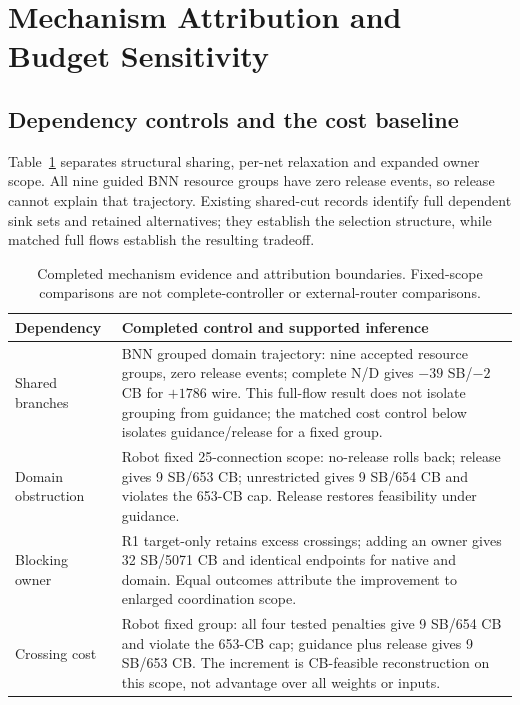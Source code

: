 \documentclass[conference,10pt]{IEEEtran}
\begin{document}
\section{Mechanism Attribution and Budget Sensitivity}
\subsection{Dependency controls and the cost baseline}
Table~\ref{tab:attribution} separates structural sharing, per-net relaxation and expanded owner scope. All nine guided BNN resource groups have zero release events, so release cannot explain that trajectory. Existing shared-cut records identify full dependent sink sets and retained alternatives; they establish the selection structure, while matched full flows establish the resulting tradeoff.

\begin{table}[t]
\centering\footnotesize\setlength{\tabcolsep}{3pt}
\caption{Completed mechanism evidence and attribution boundaries. Fixed-scope comparisons are not complete-controller or external-router comparisons.}
\label{tab:attribution}
\begin{tabular}{p{}p{}}\hline
Dependency & Completed control and supported inference\\\hline
Shared branches & BNN grouped domain trajectory: nine accepted resource groups, zero release events; complete N/D gives $-39$ SB/$-2$ CB for $+1786$ wire. This full-flow result does not isolate grouping from guidance; the matched cost control below isolates guidance/release for a fixed group.\\
Domain obstruction & Robot fixed 25-connection scope: no-release rolls back; release gives 9 SB/653 CB; unrestricted gives 9 SB/654 CB and violates the 653-CB cap. Release restores feasibility under guidance.\\
Blocking owner & R1 target-only retains excess crossings; adding an owner gives 32 SB/5071 CB and identical endpoints for native and domain. Equal outcomes attribute the improvement to enlarged coordination scope.\\
Crossing cost & Robot fixed group: all four tested penalties give 9 SB/654 CB and violate the 653-CB cap; guidance plus release gives 9 SB/653 CB. The increment is CB-feasible reconstruction on this scope, not advantage over all weights or inputs.\\\hline
\end{tabular}
\end{table}
\end{document}
